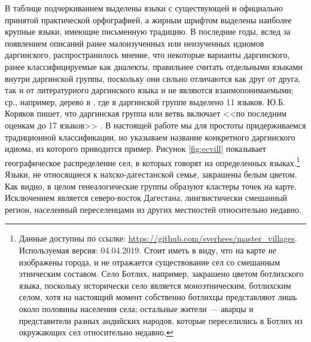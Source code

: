\par В таблице подчеркиванием выделены языки с существующей и официально принятой практической орфографией, а жирным шрифтом выделены наиболее крупные языки, имеющие письменную традицию. В последние годы, вслед за появлением описаний ранее малоизученных или неизученных идиомов даргинского, распространилось мнение, что некоторые варианты даргинского, ранее классифицируемые как диалекты, правильнее считать отдельными языками внутри даргинской группы, поскольку они сильно отличаются как друг от друга, так и от литературного даргинского языка и не являются взаимопонимаемыми; ср., например, дерево в \citep[21]{koryakov2006}, где в даргинской группе выделено 11 языков. Ю.Б. Коряков пишет, что даргинская группа или ветвь включает <<по последним оценкам до 17 языков>> \citep[11]{koryakov2006}. В настоящей работе мы для простоты придерживаемся традиционной классификации, но указываем название конкретного даргинского идиома, из которого приводится пример. Рисунок \ref{fig:ecvill} показывает географическое распределение сел, в которых говорят на определенных языках.\footnote{Данные доступны по ссылке: \url{https://github.com/sverhees/master_villages}. Используемая версия: 04.04.2019. Стоит иметь в виду, что на карте \textit{не} изображены города, и не отражается существование сел со смешанным этническим составом. Село Ботлих, например, закрашено цветом ботлихского языка, поскольку исторически село является моноэтническим, ботлихским селом, хотя на настоящий момент собственно ботлихцы представляют лишь около половины населения села; остальные жители --- аварцы и представители разных андийских народов, которые переселились в Ботлих из окружающих сел относительно недавно.} Языки, не относящиеся к нахско-дагестанской семье, закрашены белым цветом. Как видно, в целом генеалогические группы образуют кластеры точек на карте. Исключением является северо-восток Дагестана, лингвистически смешанный регион, населенный переселенцами из других местностей относительно недавно.

\label{map}

